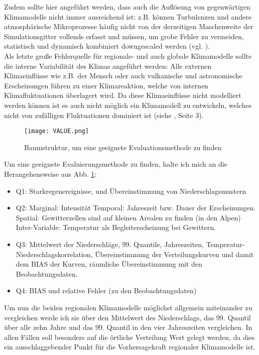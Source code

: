 Zudem sollte hier angeführt werden, dass auch die Auflösung von gegenwärtigen Klimamodelle nicht immer ausreichend ist: z.B. können Turbulenzen und andere atmosphärische Mikroprozesse häufig nicht von der derzeitigen Maschenweite der Simulationsgitter vollends erfasst und müssen, um grobe Fehler zu vermeiden, statistisch und dynamisch kombiniert downgescaled werden (vgl. \cite{marauntowards}).\\
Als letzte große Fehlerquelle für regionale- und auch globale Klimamodelle sollte die interne Variabilität des Klimas angeführt werden: Alle externen Klimaeinflüsse wie z.B. der Mensch oder auch vulkanische und astronomische Erscheinungen führen zu einer Klimareaktion, welche von internen Klimafluktuationen überlagert wird. Da diese Klimaeinflüsse nicht modelliert werden können ist es auch nicht möglich ein Klimamodell zu entwickeln, welches nicht von zufälligen Fluktuationen dominiert ist (siehe \cite{maraun_value}, Seite 3).\\
\begin{figure}[h]
	\centering
	\texttt{[image: VALUE.png]}
	\caption{Baumstruktur, um eine geeignete Evaluationsmethode zu finden \cite{maraun_value}}
	\label{fig:value}
\end{figure}

Um eine geeignete Evaluierungsmethode zu finden, halte ich mich an die Herangehensweise aus Abb. \ref{fig:value}:
\begin{itemize}
	\item Q1: Starkregenereignisse, und Übereinstimmung von Niederschlagsmustern
	\item Q2:
		\subitem{*} Marginal: Intensität
		\subitem{*} Temporal: Jahreszeit bzw. Dauer der Erscheinungen.
		\subitem{*} Spatial: Gewitterzellen sind auf kleinen Arealen zu finden (in den Alpen)
		\subitem{*} Inter-Variable: Temperatur als Begleiterscheinung bei Gewittern.
	\item Q3: Mittelwert der Niederschläge, 99. Quantile, Jahreszeiten, Temperatur-Niederschlagskorrelation, Übereinstimmung der Verteilungskurven und damit dem BIAS der Kurven, räumliche Übereinstimmung mit den Beobachtungsdaten.
	\item Q4: BIAS und relative Fehler (zu den Beobachtungsdaten)
\end{itemize}

Um nun die beiden regionalen Klimamodelle möglichst allgemein miteinander zu vergleichen werde ich sie über den Mittelwert des Niederschlags, das 99. Quantil über alle zehn Jahre und das 99. Quantil in den vier Jahreszeiten vergleichen. In allen Fällen soll besonders auf die örtliche Verteilung Wert gelegt werden, da dies ein ausschlaggebender Punkt für die Vorhersagekraft regionaler Klimamodelle ist.



